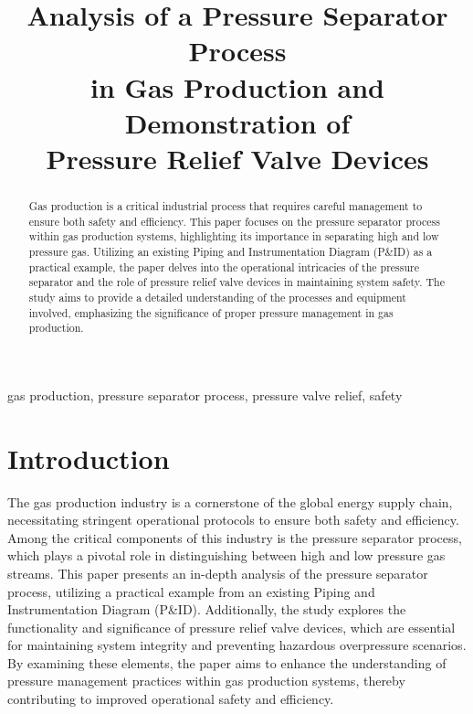 \documentclass[conference]{IEEEtran}
\begin{document}
\title{Analysis of a Pressure Separator Process \\
    in Gas Production and Demonstration of \\
    Pressure Relief Valve Devices \\
}

\author{
}


\maketitle

\begin{abstract}
    Gas production is a critical industrial process that requires careful management to ensure both safety and efficiency. This paper focuses on the pressure separator process within gas production systems, highlighting its importance in separating high and low pressure gas. Utilizing an existing Piping and Instrumentation Diagram (P\&ID) as a practical example, the paper delves into the operational intricacies of the pressure separator and the role of pressure relief valve devices in maintaining system safety. The study aims to provide a detailed understanding of the processes and equipment involved, emphasizing the significance of proper pressure management in gas production.
\end{abstract}

\begin{IEEEkeywords}
    gas production, pressure separator process, pressure valve relief, safety
\end{IEEEkeywords}

\section{Introduction}

The gas production industry is a cornerstone of the global energy supply chain, necessitating stringent operational protocols to ensure both safety and efficiency. Among the critical components of this industry is the pressure separator process, which plays a pivotal role in distinguishing between high and low pressure gas streams. This paper presents an in-depth analysis of the pressure separator process, utilizing a practical example from an existing Piping and Instrumentation Diagram (P\&ID). Additionally, the study explores the functionality and significance of pressure relief valve devices, which are essential for maintaining system integrity and preventing hazardous overpressure scenarios. By examining these elements, the paper aims to enhance the understanding of pressure management practices within gas production systems, thereby contributing to improved operational safety and efficiency.
\end{document}

